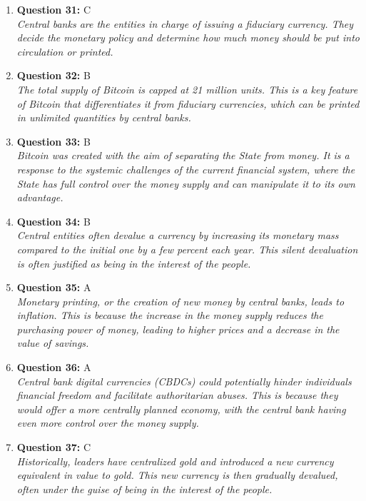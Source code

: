 \documentclass[12pt,a4paper]{article}
\begin{document}
\begin{enumerate}
\item \textbf{Question 31:} C
\\ \textit{Central banks are the entities in charge of issuing a fiduciary currency. They decide the monetary policy and determine how much money should be put into circulation or printed.}

\item \textbf{Question 32:} B
\\ \textit{The total supply of Bitcoin is capped at 21 million units. This is a key feature of Bitcoin that differentiates it from fiduciary currencies, which can be printed in unlimited quantities by central banks.}

\item \textbf{Question 33:} B
\\ \textit{Bitcoin was created with the aim of separating the State from money. It is a response to the systemic challenges of the current financial system, where the State has full control over the money supply and can manipulate it to its own advantage.}

\item \textbf{Question 34:} B
\\ \textit{Central entities often devalue a currency by increasing its monetary mass compared to the initial one by a few percent each year. This silent devaluation is often justified as being in the interest of the people.}

\item \textbf{Question 35:} A
\\ \textit{Monetary printing, or the creation of new money by central banks, leads to inflation. This is because the increase in the money supply reduces the purchasing power of money, leading to higher prices and a decrease in the value of savings.}

\item \textbf{Question 36:} A
\\ \textit{Central bank digital currencies (CBDCs) could potentially hinder individuals financial freedom and facilitate authoritarian abuses. This is because they would offer a more centrally planned economy, with the central bank having even more control over the money supply.}

\item \textbf{Question 37:} C
\\ \textit{Historically, leaders have centralized gold and introduced a new currency equivalent in value to gold. This new currency is then gradually devalued, often under the guise of being in the interest of the people.}


\end{enumerate}
\end{document}
